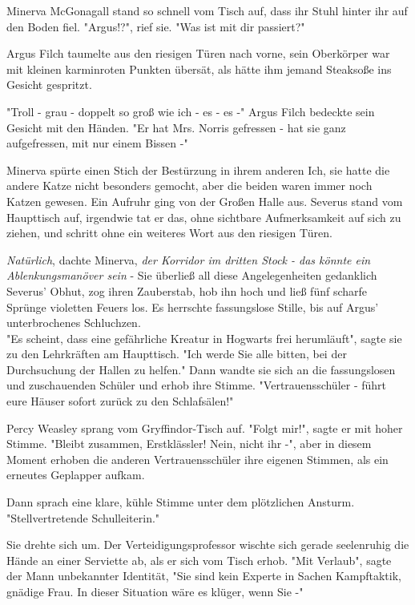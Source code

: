 {Minerva McGonagall stand so schnell vom Tisch auf, dass ihr Stuhl hinter ihr auf den Boden fiel. "Argus!?", rief sie. "Was ist mit dir passiert?"

Argus Filch taumelte aus den riesigen Türen nach vorne, sein Oberkörper war mit kleinen karminroten Punkten übersät, als hätte ihm jemand Steaksoße ins Gesicht gespritzt.

"Troll - grau - doppelt so groß wie ich - es - es -" Argus Filch bedeckte sein Gesicht mit den Händen. "Er hat Mrs. Norris gefressen - hat sie ganz aufgefressen, mit nur einem Bissen -"

Minerva spürte einen Stich der Bestürzung in ihrem anderen Ich, sie hatte die andere Katze nicht besonders gemocht, aber die beiden waren immer noch Katzen gewesen. Ein Aufruhr ging von der Großen Halle aus. Severus stand vom Haupttisch auf, irgendwie tat er das, ohne sichtbare Aufmerksamkeit auf sich zu ziehen, und schritt ohne ein weiteres Wort aus den riesigen Türen.

\emph{Natürlich}, dachte Minerva, \emph{der Korridor im dritten Stock - das könnte ein Ablenkungsmanöver sein} - Sie überließ all diese Angelegenheiten gedanklich Severus' Obhut, zog ihren Zauberstab, hob ihn hoch und ließ fünf scharfe Sprünge violetten Feuers los. Es herrschte fassungslose Stille, bis auf Argus' unterbrochenes Schluchzen.\\ "Es scheint, dass eine gefährliche Kreatur in Hogwarts frei herumläuft", sagte sie zu den Lehrkräften am Haupttisch. "Ich werde Sie alle bitten, bei der Durchsuchung der Hallen zu helfen." Dann wandte sie sich an die fassungslosen und zuschauenden Schüler und erhob ihre Stimme. "Vertrauensschüler - führt eure Häuser sofort zurück zu den Schlafsälen!"

Percy Weasley sprang vom Gryffindor-Tisch auf. "Folgt mir!", sagte er mit hoher Stimme. "Bleibt zusammen, Erstklässler! Nein, nicht ihr -", aber in diesem Moment erhoben die anderen Vertrauensschüler ihre eigenen Stimmen, als ein erneutes Geplapper aufkam.

Dann sprach eine klare, kühle Stimme unter dem plötzlichen Ansturm. "Stellvertretende Schulleiterin."

Sie drehte sich um. Der Verteidigungsprofessor wischte sich gerade seelenruhig die Hände an einer Serviette ab, als er sich vom Tisch erhob. "Mit Verlaub", sagte der Mann unbekannter Identität, "Sie sind kein Experte in Sachen Kampftaktik, gnädige Frau. In dieser Situation wäre es klüger, wenn Sie -"

}
